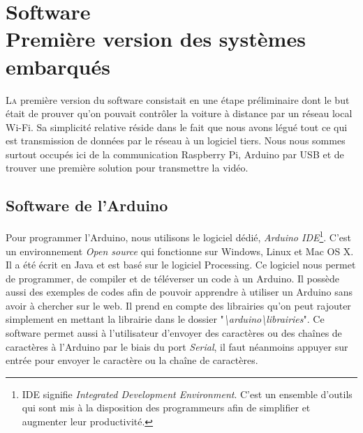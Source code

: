 \documentclass[a4paper,11pt]{report}
\begin{document}
{\chapter{Software \\  Première version des systèmes embarqués}

\lettrine{L}{a} première version du software consistait en une étape préliminaire dont le but était de prouver qu'on pouvait contrôler la voiture à distance par un réseau local Wi-Fi. Sa simplicité relative réside dans le fait que nous avons légué tout ce qui est transmission de données par le réseau à un logiciel tiers. Nous nous sommes surtout occupés ici de la communication Raspberry Pi, Arduino par USB et de trouver une première solution pour transmettre la vidéo.

\section{Software de l'Arduino}
Pour programmer l'Arduino, nous utilisons le logiciel dédié, \textit{Arduino IDE}\footnote{IDE signifie \textit{Integrated Development Environment}. C'est un ensemble d'outils qui sont mis à la disposition des programmeurs afin de simplifier et augmenter leur productivité.}. C'est un environnement \textit{Open source} qui fonctionne sur Windows, Linux et Mac OS X. Il a été écrit en Java et est basé sur le logiciel Processing.
Ce logiciel nous permet de programmer, de compiler et de téléverser un code à un Arduino. Il possède aussi des exemples de codes afin de pouvoir apprendre à utiliser un Arduino sans avoir à chercher sur le web. Il prend en compte des librairies qu'on peut rajouter simplement en mettant la librairie dans le dossier "\textit{\textbackslash arduino\textbackslash librairies}". Ce software permet aussi à l'utilisateur d'envoyer des caractères ou des chaînes de caractères à l'Arduino par le biais du port \textit{Serial}, il faut néanmoins appuyer sur entrée pour envoyer le caractère ou la chaîne de caractères.


}
\end{document}
